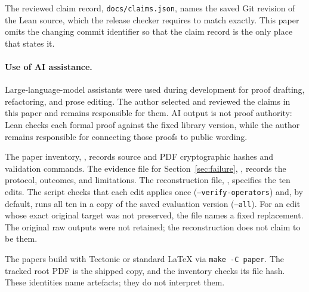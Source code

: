 \documentclass[11pt]{article}
\begin{document}
The reviewed claim record, \texttt{docs/claims.json}, names the saved Git
revision of the Lean source, which the release checker requires to match
exactly.  This paper omits the changing commit identifier so that the claim
record is the only place that states it.

\paragraph{Use of AI assistance.} Large-language-model assistants were used
during development for proof drafting, refactoring, and prose editing.  The
author selected and reviewed the claims in this paper and remains responsible
for them.  AI output is not proof authority: Lean checks each formal proof
against the fixed library version, while the author remains responsible for
connecting those proofs to public wording.

The paper inventory, , records source
and PDF cryptographic hashes and validation commands.  The evidence file for
Section~\ref{sec:failure}, , records the
protocol, outcomes, and limitations.  The reconstruction file,
, specifies the ten edits.
The script  checks that each edit
applies once (\texttt{--verify-operators}) and, by default, runs all ten in a
copy of the saved evaluation version (\texttt{--all}).  For an edit whose exact
original target was not preserved, the file names a fixed replacement.  The
original raw outputs were not retained; the reconstruction does not claim to
be them.

The papers build with Tectonic or standard \LaTeX{} via
\texttt{make -C paper}.  The tracked root PDF is the shipped copy, and the
inventory checks its file hash.  These identities name artefacts; they do not
interpret them.
\end{document}
